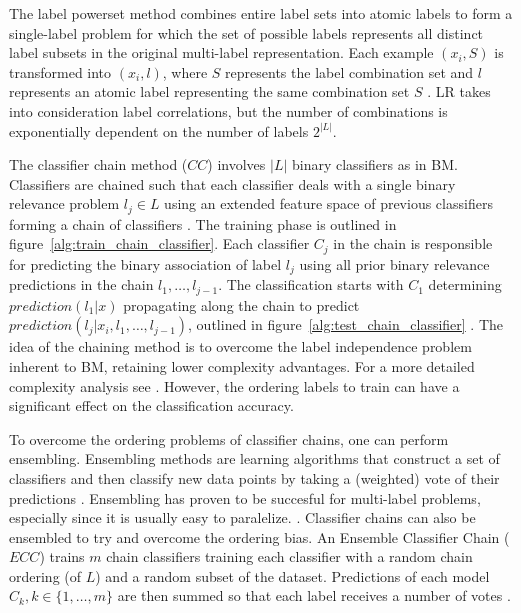 The label powerset method combines entire label sets into atomic labels 
to form a single-label problem for which the set of possible labels 
represents all distinct label subsets in the original multi-label 
representation. Each example $(x_i, S)$ is transformed into 
$(x_i, l)$, where $S$ represents the label combination set and
$l$ represents an atomic label representing the same combination set $S$
\citep{read2011classifier}. LR takes into 
consideration label correlations, but the number of combinations
is exponentially dependent on the number of labels $2^{|L|}$. 

The classifier chain method ($CC$) involves $|L|$ binary classifiers as in BM. 
Classifiers are chained such that each classifier deals with 
a single binary relevance problem $l_j \in L$ using an extended feature space of 
previous classifiers 
forming a chain of classifiers \citep{read2011classifier}.
The training phase is outlined in figure~\ref{alg:train_chain_classifier}. 
Each classifier $C_j$ in the chain is responsible for predicting 
the binary association of label $l_j$ using all prior 
binary relevance predictions in the chain $l_1, \dots, l_{j - 1}$.
The classification starts with $C_1$ determining 
$prediction(l_1 | x)$ propagating along the chain
to predict $prediction(l_j | x_i, l_1, \dots, l_{j-1})$, outlined 
in figure~\ref{alg:test_chain_classifier}
\citep{read2011classifier}.
The idea of the chaining method is to overcome the label independence problem
inherent to BM, retaining lower complexity advantages. 
For a more detailed complexity analysis see \citep{read2011classifier}. 
However, the ordering labels to train can have a significant effect on 
the classification accuracy. 

To overcome the ordering problems of classifier chains, one
can perform ensembling. 
Ensembling methods are learning algorithms 
that construct a set of classifiers and then classify new data 
points by taking a (weighted) vote of their predictions \citep{dietterich2000ensemble}.
Ensembling has proven to be succesful for multi-label 
problems, especially since it is usually easy to paralelize. 
\citep{tsoumakas2007random}. Classifier chains can also be
ensembled to try and overcome the ordering bias. An Ensemble 
Classifier Chain ($ECC$) trains $m$ chain classifiers training
each classifier with a random chain ordering (of $L$) and a random
subset of the dataset. Predictions of each  model $C_k, k \in \{1, \dots, m\}$ 
are then summed so that each label receives a number of votes
\citep{dimitriadou2001voting}.

